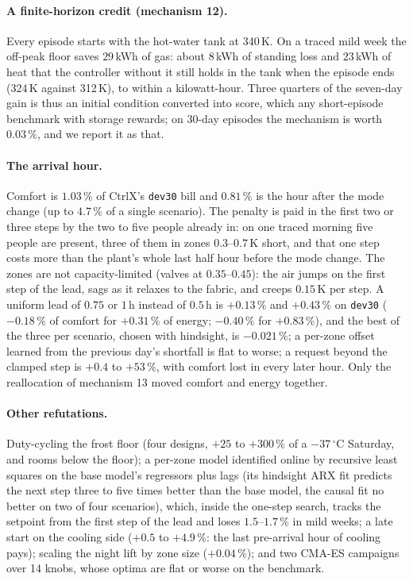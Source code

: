 \documentclass{article}
\newcommand{\cn}[1]{\texttt{#1}}
\begin{document}
\paragraph{A finite-horizon credit (mechanism 12).} Every episode starts with the hot-water
tank at 340\,K. On a traced mild week the off-peak floor saves $29$\,kWh of gas: about $8$\,kWh
of standing loss and $23$\,kWh of heat that the controller without it still holds in the tank
when the episode ends (324\,K against 312\,K), to within a kilowatt-hour. Three quarters of the seven-day gain is thus an
initial condition converted into score, which any short-episode benchmark with storage
rewards; on 30-day episodes the mechanism is worth $0.03\,\%$, and we report it as that.

\paragraph{The arrival hour.} Comfort is $1.03\,\%$ of CtrlX's \cn{dev30} bill and $0.81\,\%$ is
the hour after the mode change (up to $4.7\,\%$ of a single scenario). The penalty is paid in
the first two or three steps by the two to five people already in: on one traced morning five
people are present, three of them in zones $0.3$--$0.7$\,K short, and that one step costs more
than the plant's whole last half hour before the mode change. The zones are not
capacity-limited (valves at $0.35$--$0.45$): the air jumps on the first step of the lead, sags
as it relaxes to the fabric, and creeps $0.15$\,K per step. A uniform lead of $0.75$ or $1$\,h
instead of $0.5$\,h is $+0.13\,\%$ and $+0.43\,\%$ on \cn{dev30} ($-0.18\,\%$ of comfort for
$+0.31\,\%$ of energy; $-0.40\,\%$ for $+0.83\,\%$), and the best of the three per scenario, chosen with
hindsight, is $-0.021\,\%$; a per-zone offset learned from the previous day's shortfall is flat
to worse; a request beyond the clamped step is $+0.4$ to $+53\,\%$, with comfort lost in every
later hour. Only the reallocation of mechanism 13 moved comfort and energy together.

\paragraph{Other refutations.} Duty-cycling the frost floor (four designs, $+25$ to $+300\,\%$ of a
$-37\,^\circ$C Saturday, and rooms below the floor); a per-zone model identified online by recursive
least squares on the base model's regressors plus lags (its hindsight ARX fit predicts the next step three to five times better than the base model, the causal fit no better on two of four scenarios), which, inside the one-step
search, tracks the setpoint from the first step of the lead and loses $1.5$--$1.7\,\%$ in mild
weeks; a late start on the cooling side ($+0.5$ to $+4.9\,\%$: the last pre-arrival hour of
cooling pays); scaling the night lift by zone size ($+0.04\,\%$); and two CMA-ES campaigns over
14 knobs, whose optima are flat or worse on the benchmark.
\end{document}
